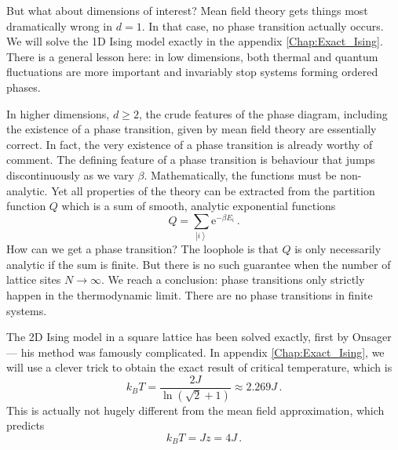\documentclass{article}
\theoremstyle{plain}\theoremheaderfont{\normalfont\bfseries}\theorembodyfont{\rmfamily}\theoremseparator{.}\newtheorem*{thm}{Theorem}\newtheorem*{law}{Law}\newtheorem*{pos}{Postulate}
\numberwithin{equation}{section}
\newcommand{\ee}{\mathrm{e}}
\newcommand{\ket}[1]{\left| #1 \right\rangle}
\begin{document}
    But what about dimensions of interest? Mean field theory gets things most dramatically wrong in \(d=1\). In that case, no phase transition actually occurs. We will solve the 1D Ising model exactly in the appendix \cref{Chap:Exact_Ising}. There is a general lesson here: in low dimensions, both thermal and quantum fluctuations are more important and invariably stop systems forming ordered phases.

    In higher dimensions, \(d\ge 2\), the crude features of the phase diagram, including the existence of a phase transition, given by mean field theory are essentially correct. In fact, the very existence of a phase transition is already worthy of comment. The defining feature of a phase transition is behaviour that jumps discontinuously as we vary \(\beta\). Mathematically, the functions must be non-analytic. Yet all properties of the theory can be extracted from the partition function \(Q\) which is a sum of smooth, analytic exponential functions
    \begin{equation}
        Q=\sum_{\ket{i}}\ee^{-\beta E_i}\,.
    \end{equation}
    How can we get a phase transition? The loophole is that \(Q\) is only necessarily analytic if the sum is finite. But there is no such guarantee when the number of lattice sites \(N\to\infty\). We reach a conclusion: phase transitions only strictly happen in the thermodynamic limit. There are no phase transitions in finite systems.

    The 2D Ising model in a square lattice has been solved exactly, first by Onsager --- his method was famously complicated. In appendix \cref{Chap:Exact_Ising}, we will use a clever trick to obtain the exact result of critical temperature, which is
    \begin{equation}
        k_B T=\frac{2J}{\ln(\sqrt{2}+1)}\approx 2.269J\,.
    \end{equation}
    This is actually not hugely different from the mean field approximation, which predicts
    \begin{equation}
        k_B T=Jz=4J\,.
    \end{equation}
\end{document}
